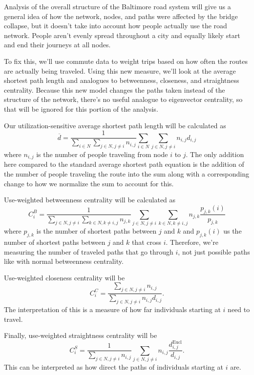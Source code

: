 \documentclass[11pt]{article}
\numberwithin{equation}{section} %
\numberwithin{figure}{section} %
\numberwithin{table}{section} %
\theoremstyle{definition}
\begin{document}
Analysis of the overall structure of the Baltimore road system will give us a general idea of how the network, nodes, and paths were affected by the bridge collapse, but it doesn't take into account how people actually use the road network. People aren't evenly spread throughout a city and equally likely start and end their journeys at all nodes.

To fix this, we'll use commute data to weight trips based on how often the routes are actually being traveled. Using this new measure, we'll look at the average shortest path length and analogues to betweenness, closeness, and straightness centrality. Because this new model changes the paths taken instead of the structure of the network, there's no useful analogue to eigenvector centrality, so that will be ignored for this portion of the analysis.

Our utilization-sensitive average shortest path length will be calculated as
\[
  \overline{d} = \frac{1}{\sum_{i \in N} \sum_{j \in N, j \neq i} n_{i, j}} \sum_{i \in N} \sum_{j \in N, j \neq i} n_{i, j} d_{i, j}
\]
where $n_{i, j}$ is the number of people traveling from node $i$ to $j$. The only addition here compared to the standard average shortest path equation is the addition of the number of people traveling the route into the sum along with a corresponding change to how we normalize the sum to account for this. 

Use-weighted betweenness centrality will be calculated as
\[
  C_i^B = \frac{1}{\sum_{j \in N, j \neq i} \sum_{k \in N, k \neq i, j} n_{j, k}} \sum_{j \in N, j \neq i} \sum_{k \in N, k \neq i, j} n_{j, k} \frac{p_{j, k} (i)}{p_{j, k}}
\]
where $p_{j, k}$ is the number of shortest paths between $j$ and $k$ and $p_{j, k} (i)$ us the number of shortest paths between $j$ and $k$ that cross $i$. Therefore, we're measuring the number of traveled paths that go through $i$, not just possible paths like with normal betweenness centrality.

Use-weighted closeness centrality will be
\[
  C_i^C = \frac{\sum_{j \in N, j \neq i} n_{i, j}}{\sum_{j \in N, j \neq i} n_{i, j} d_{i, j}}.
\]
The interpretation of this is a measure of how far individuals starting at $i$ need to travel.

Finally, use-weighted straightness centrality will be
\[
  C_i^S = \frac{1}{\sum_{j \in N, j \neq i} n_{i, j}} \sum_{j \in N, j \neq i} n_{i, j} \frac{d_{i, j}^\text{Eucl}}{d_{i, j}}.
\]
This can be interpreted as how direct the paths of individuals starting at $i$ are.
\end{document}
